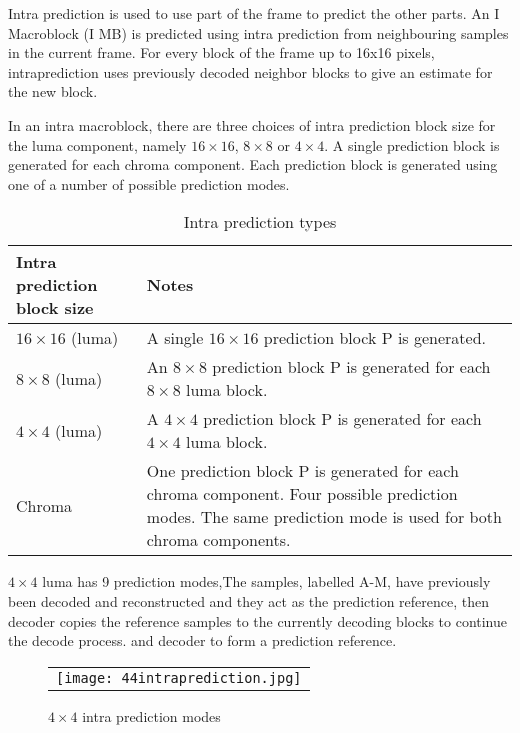 \documentclass[../main.tex]{subfiles}
\begin{document}
Intra prediction is used to use part of the frame
to predict the other parts. An I Macroblock (I MB) is predicted using intra prediction from neighbouring samples in the current frame. For every block of the frame up to 16x16 pixels, intraprediction uses previously decoded neighbor blocks to give an estimate for the new
block. 

In an intra macroblock, there are three choices of intra prediction block size for the luma
component, namely $16 \times 16$, $8 \times 8$ or $4 \times 4$. A single prediction block is generated for each
chroma component. Each prediction block is generated using one of a number of possible
prediction modes. 

\begin{table}[ht]
\label{tab:list}
\begin{center}       
\begin{tabular}{|l|p{10cm}|} 
\hline
\rule[-1ex]{0pt}{3.5ex}  Intra prediction block size & Notes\\  
\hline
\rule[-1ex]{0pt}{3.5ex}  $16 \times 16$ (luma) &  A single $16 \times 16$ prediction block P is generated.   \\
\hline
\rule[-1ex]{0pt}{3.5ex}  $8 \times 8$ (luma) & An $8 \times 8$ prediction block P is generated for each $8 \times 8$ luma block.
 \\
\hline
\rule[-1ex]{0pt}{3.5ex}  $4 \times 4$ (luma) & A $4 \times 4$ prediction block P is generated for each $4 \times 4$ luma block.   \\
\hline
\rule[-1ex]{0pt}{3.5ex}  Chroma & One prediction block P is generated for each chroma component.
Four possible prediction modes. The same prediction mode is used
for both chroma components.  \\
\hline

\end{tabular}
\end{center}
\caption{Intra prediction types} 
\end{table}

$4 \times 4$ luma has 9 prediction modes,The samples, labelled A-M, have previously been decoded and reconstructed and they act as the prediction reference, then decoder copies the reference samples to the currently decoding blocks to continue the decode process.
and decoder to form a prediction reference. 

 \begin{figure} [ht]
   \begin{center}
   \begin{tabular}{c} %
   \texttt{[image: 44intraprediction.jpg]}
   \end{tabular}
   \end{center}
   \caption[predmodes] 
   { \label{fig:4x4predmodes} 
$4 \times 4$ intra prediction modes }
   \end{figure}     %
   
\end{document}
